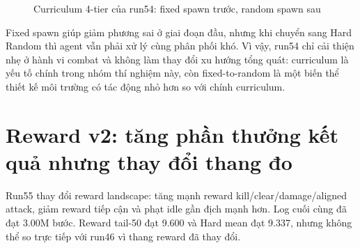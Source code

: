 \begin{figure}[H]
    \centering
    \caption{Curriculum 4-tier của run54: fixed spawn trước, random spawn sau}
    \label{fig:run54_four_tier}
\end{figure}

Fixed spawn giúp giảm phương sai ở giai đoạn đầu, nhưng khi chuyển sang Hard Random thì agent vẫn phải xử lý cùng phân phối khó. Vì vậy, run54 chỉ cải thiện nhẹ ở hành vi combat và không làm thay đổi xu hướng tổng quát: curriculum là yếu tố chính trong nhóm thí nghiệm này, còn fixed-to-random là một biến thể thiết kế môi trường có tác động nhỏ hơn so với chính curriculum.

\section{Reward v2: tăng phần thưởng kết quả nhưng thay đổi thang đo}

Run55 thay đổi reward landscape: tăng mạnh reward kill/clear/damage/aligned attack, giảm reward tiếp cận và phạt idle gần địch mạnh hơn. Log cuối cùng đã đạt 3.00M bước. Reward tail-50 đạt 9.600 và Hard mean đạt 9.337, nhưng không thể so trực tiếp với run46 vì thang reward đã thay đổi.

